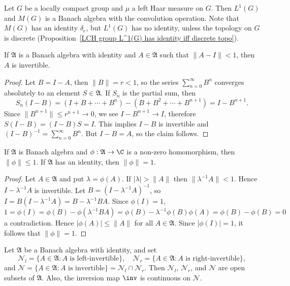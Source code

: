 \begin{example}
Let $G$ be a locally compact group and $\mu$ a left Haar measure on $G$. Then $L^1(G)$ and $M(G)$ is a Banach algebra with the convolution operation. Note that $M(G)$ has an identity $\delta_e$, but $L^1(G)$ has no identity, unless the topology on $G$ is discrete (Proposition~\ref{LCH group L^1(G) has identity iff discrete topo}).
\end{example}
\begin{lemma}\label{Banach algebra invertible lemma}
If $\mathfrak{A}$ is a Banach algebra with identity and $A\in\mathfrak{A}$ such that $\|A-I\|<1$, then $A$ is invertible.
\end{lemma}
\begin{proof}
Let $B=I-A$, then $\|B\|=r<1$, so the series $\sum_{n=0}^{\infty}B^n$ converges absolutely to an element $S\in\mathfrak{A}$. If $S_n$ is the partial sum, then
\[S_n(I-B)=(I+B+\cdots+B^n)-(B+B^2+\cdots+B^{n+1})=I-B^{n+1}.\]
Since $\|B^{n+1}\|\leq r^{n+1}\to 0$, we see $I-B^{n+1}\to I$, therefore $S(I-B)=(I-B)S=I$. This implies $I-B$ is invertible and $(I-B)^{-1}=\sum_{n=0}^{\infty}B^n$. But $I-B=A$, so the claim follows.
\end{proof}
\begin{proposition}\label{Banach algebran abelian homomorphism to C}
If $\mathfrak{A}$ is Banach algebra and $\phi:\mathfrak{A}\to\C$ is a non-zero homomorphism, then $\|\phi\|\leq 1$. If $\mathfrak{A}$ has an identity, then $\|\phi\|=1$.
\end{proposition}
\begin{proof}
Let $A\in\mathfrak{A}$ and put $\lambda=\phi(A)$. If $|\lambda|>\|A\|$ then $\|\lambda^{-1}A\|<1$. Hence $I-\lambda^{-1}A$ is invertible. Let $B=(I-\lambda^{-1}A)^{-1}$, so $I=B(I-\lambda^{-1}A)=B-\lambda^{-1}BA$. Since $\phi(I)=1$, 
\[1=\phi(I)=\phi(B)-\phi(\lambda^{-1}BA)=\phi(B)-\lambda^{-1}\phi(B)\phi(A)=\phi(B)-\phi(B)=0\]
a contradiction. Hence $|\phi(A)|\leq\|A\|$ for all $A\in\mathfrak{A}$. Since $|\phi(I)|=1$, it follows that $\|\phi\|=1$.
\end{proof}
\begin{theorem}\label{Banach algebra invertible is open set}
Let $\mathfrak{A}$ be a Banach algebra with identity, and set
\[\mathscr{N}_l=\{A\in\mathfrak{A}:\text{$A$ is left-invertible}\},\quad \mathscr{N}_r=\{A\in\mathfrak{A}:\text{$A$ is right-invertible}\},\]
and $\mathscr{N}=\{A\in\mathfrak{A}:\text{$A$ is invertible}\}=\mathscr{N}_l\cap\mathscr{N}_r$. Then $\mathscr{N}_l$, $\mathscr{N}_r$, and $\mathscr{N}$ are open subsets of $\mathfrak{A}$. Also, the inversion map $\inv$ is continuous on $\mathscr{N}$.
\end{theorem}
